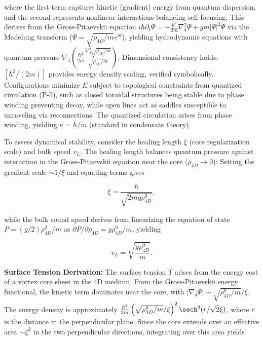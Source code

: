 where the first term captures kinetic (gradient) energy from quantum dispersion, and the second represents nonlinear interactions balancing self-focusing. This derives from the Gross-Pitaevskii equation $i \hbar \partial_t \Psi = -\frac{\hbar^2}{2 m} \nabla_4^2 \Psi + g m |\Psi|^2 \Psi$ via the Madelung transform ($\Psi = \sqrt{\rho_{4D}/m} e^{i \theta}$), yielding hydrodynamic equations with quantum pressure $\nabla_4 \left( \frac{\hbar^2}{2 m} \frac{\nabla_4^2 \sqrt{\rho_{4D}/m}}{\sqrt{\rho_{4D}/m}} \right)$. Dimensional consistency holds: $[\hbar^2 / (2m)]$ provides energy density scaling, verified symbolically. Configurations minimize $E$ subject to topological constraints from quantized circulation (P-5), such as closed toroidal structures being stable due to phase winding preventing decay, while open lines act as saddles susceptible to unraveling via reconnections. The quantized circulation arises from phase winding, yielding $\kappa = h / m$ (standard in condensate theory).

To assess dynamical stability, consider the healing length $\xi$ (core regularization scale) and bulk speed $v_L$. The healing length balances quantum pressure against interaction in the Gross-Pitaevskii equation near the core ($\rho_{4D} \to 0$): Setting the gradient scale $\sim 1/\xi$ and equating terms gives

\begin{equation}
\xi = \frac{\hbar}{\sqrt{2 m g \rho_{4D}^0}},
\end{equation}

while the bulk sound speed derives from linearizing the equation of state $P = (g/2) \rho_{4D}^2 / m$ as $\partial P / \partial \rho_{4D} = g \rho_{4D}^0 / m$, yielding

\begin{equation}
v_L = \sqrt{\frac{g \rho_{4D}^0}{m}}.
\end{equation}

\textbf{Surface Tension Derivation:} The surface tension $T$ arises from the energy cost of a vortex core sheet in the 4D medium. From the Gross-Pitaevskii energy functional, the kinetic term dominates near the core, with $|\nabla_4 \Psi| \sim \sqrt{\rho_{4D}^0 / m} / \xi$. The energy density is approximately $\frac{\hbar^2}{2m} \left( \sqrt{\rho_{4D}^0 / m} / \xi \right)^2 \sech^4(r / \sqrt{2} \xi)$, where $r$ is the distance in the perpendicular plane. Since the core extends over an effective area $\sim \xi^2$ in the two perpendicular directions, integrating over this area yields

